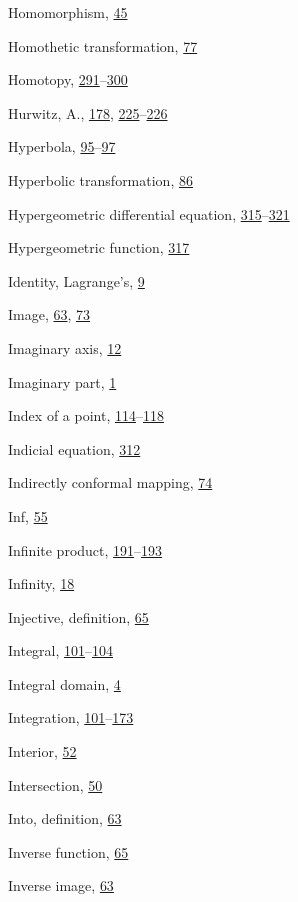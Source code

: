 \begin{theindex}
\item Homomorphism, \hyperlink{orig-p45}{45}
\item Homothetic transformation, \hyperlink{orig-p77}{77}
\item Homotopy, \hyperlink{orig-p291}{291}--\hyperlink{orig-p300}{300}
\item Hurwitz, A., \hyperlink{orig-p178}{178}, \hyperlink{orig-p225}{225}--\hyperlink{orig-p226}{226}
\item Hyperbola, \hyperlink{orig-p95}{95}--\hyperlink{orig-p97}{97}
\item Hyperbolic transformation, \hyperlink{orig-p86}{86}
\item Hypergeometric differential equation, \hyperlink{orig-p315}{315}--\hyperlink{orig-p321}{321}
\item Hypergeometric function, \hyperlink{orig-p317}{317}
\item Identity, Lagrange's, \hyperlink{orig-p9}{9}
\item Image, \hyperlink{orig-p63}{63}, \hyperlink{orig-p73}{73}
\item Imaginary axis, \hyperlink{orig-p12}{12}
\item Imaginary part, \hyperlink{orig-p1}{1}
\item Index of a point, \hyperlink{orig-p114}{114}--\hyperlink{orig-p118}{118}
\item Indicial equation, \hyperlink{orig-p312}{312}
\item Indirectly conformal mapping, \hyperlink{orig-p74}{74}
\item Inf, \hyperlink{orig-p55}{55}
\item Infinite product, \hyperlink{orig-p191}{191}--\hyperlink{orig-p193}{193}
\item Infinity, \hyperlink{orig-p18}{18}
\item Injective, definition, \hyperlink{orig-p65}{65}
\item Integral, \hyperlink{orig-p101}{101}--\hyperlink{orig-p104}{104}
\item Integral domain, \hyperlink{orig-p4}{4}
\item Integration, \hyperlink{orig-p101}{101}--\hyperlink{orig-p173}{173}
\item Interior, \hyperlink{orig-p52}{52}
\item Intersection, \hyperlink{orig-p50}{50}
\item Into, definition, \hyperlink{orig-p63}{63}
\item Inverse function, \hyperlink{orig-p65}{65}
\item Inverse image, \hyperlink{orig-p63}{63}

\end{theindex}
